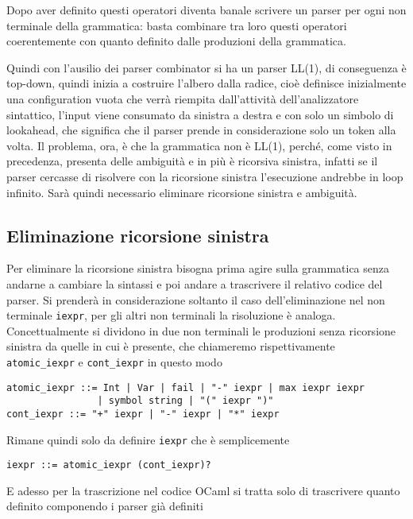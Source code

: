 \documentclass[]{article}
\begin{document}
Dopo aver definito questi operatori diventa banale scrivere un parser
per ogni non terminale della grammatica: basta combinare tra loro questi
operatori coerentemente con quanto definito dalle produzioni della
grammatica.

Quindi con l'ausilio dei parser combinator si ha un parser LL(1), di
conseguenza è top-down, quindi inizia a costruire l'albero dalla radice,
cioè definisce inizialmente una configuration vuota che verrà riempita
dall'attività dell'analizzatore sintattico, l'input viene consumato da
sinistra a destra e con solo un simbolo di lookahead, che significa che
il parser prende in considerazione solo un token alla volta. Il
problema, ora, è che la grammatica non è LL(1), perché, come visto in
precedenza, presenta delle ambiguità e in più è ricorsiva sinistra,
infatti se il parser cercasse di risolvere con la ricorsione sinistra
l'esecuzione andrebbe in loop infinito. Sarà quindi necessario eliminare
ricorsione sinistra e ambiguità.

\hypertarget{eliminazione-ricorsione-sinistra}{%
\subsection{Eliminazione ricorsione
sinistra}\label{eliminazione-ricorsione-sinistra}}

Per eliminare la ricorsione sinistra bisogna prima agire sulla
grammatica senza andarne a cambiare la sintassi e poi andare a
trascrivere il relativo codice del parser. Si prenderà in considerazione
soltanto il caso dell'eliminazione nel non terminale \texttt{iexpr}, per
gli altri non terminali la risoluzione è analoga. Concettualmente si
dividono in due non terminali le produzioni senza ricorsione sinistra da
quelle in cui è presente, che chiameremo rispettivamente
\texttt{atomic\_iexpr} e \texttt{cont\_iexpr} in questo modo

\begin{verbatim}
atomic_iexpr ::= Int | Var | fail | "-" iexpr | max iexpr iexpr 
                | symbol string | "(" iexpr ")"
cont_iexpr ::= "+" iexpr | "-" iexpr | "*" iexpr 
\end{verbatim}

Rimane quindi solo da definire \texttt{iexpr} che è semplicemente

\begin{verbatim}
iexpr ::= atomic_iexpr (cont_iexpr)?
\end{verbatim}

E adesso per la trascrizione nel codice OCaml si tratta solo di
trascrivere quanto definito componendo i parser già definiti
\end{document}
